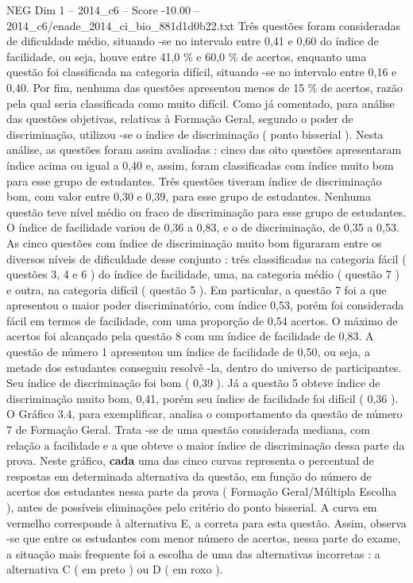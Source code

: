 \begin{textsample}{NEG Dim 1 – 2014\_c6 – Score -10.00 – 2014\_c6/enade\_2014\_ci\_bio\_881d1d0b22.txt}
Três questões foram consideradas de dificuldade médio, situando -se no intervalo entre 0,41 e 0,60 do índice de facilidade, ou seja, houve entre 41,0 \% e 60,0 \% de acertos, enquanto uma questão foi classificada na categoria difícil, situando -se no intervalo entre 0,16 e 0,40.
Por fim, nenhuma das questões apresentou menos de 15 \% de acertos, razão pela qual seria classificada como muito difícil.
Como já comentado, para análise das questões objetivas, relativas à Formação Geral, segundo o poder de discriminação, utilizou -se o índice de discriminação ( ponto bisserial ).
Nesta análise, as questões foram assim avaliadas : cinco das oito questões apresentaram índice acima ou igual a 0,40 e, assim, foram classificadas com índice muito bom para esse grupo de estudantes.
Três questões tiveram índice de discriminação bom, com valor entre 0,30 e 0,39, para esse grupo de estudantes.
Nenhuma questão teve nível médio ou fraco de discriminação para esse grupo de estudantes.
O índice de facilidade variou de 0,36 a 0,83, e o de discriminação, de 0,35 a 0,53.
As cinco questões com índice de discriminação muito bom figuraram entre os diversos níveis de dificuldade desse conjunto : três classificadas na categoria fácil ( questões 3, 4 e 6 ) do índice de facilidade, uma, na categoria médio ( questão 7 ) e outra, na categoria difícil ( questão 5 ).
Em particular, a questão 7 foi a que apresentou o maior poder discriminatório, com índice 0,53, porém foi considerada fácil em termos de facilidade, com uma proporção de 0,54 acertos.
O máximo de acertos foi alcançado pela questão 8 com um índice de facilidade de 0,83.
A questão de número 1 apresentou um índice de facilidade de 0,50, ou seja, a metade dos estudantes conseguiu resolvê -la, dentro do universo de participantes.
Seu índice de discriminação foi bom ( 0,39 ).
Já a questão 5 obteve índice de discriminação muito bom, 0,41, porém seu índice de facilidade foi difícil ( 0,36 ).
O Gráfico 3.4, para exemplificar, analisa o comportamento da questão de número 7 de Formação Geral.
Trata -se de uma questão considerada mediana, com relação a facilidade e a que obteve o maior índice de discriminação dessa parte da prova.
Neste gráfico, \textbf{cada} uma das cinco curvas representa o percentual de respostas em determinada alternativa da questão, em função do número de acertos dos estudantes nessa parte da prova ( Formação Geral/Múltipla Escolha ), antes de possíveis eliminações pelo critério do ponto bisserial.
A curva em vermelho corresponde à alternativa E, a correta para esta questão.
Assim, observa -se que entre os estudantes com menor número de acertos, nessa parte do exame, a situação mais frequente foi a escolha de uma das alternativas incorretas : a alternativa C ( em preto ) ou D ( em roxo ).

\end{textsample}
